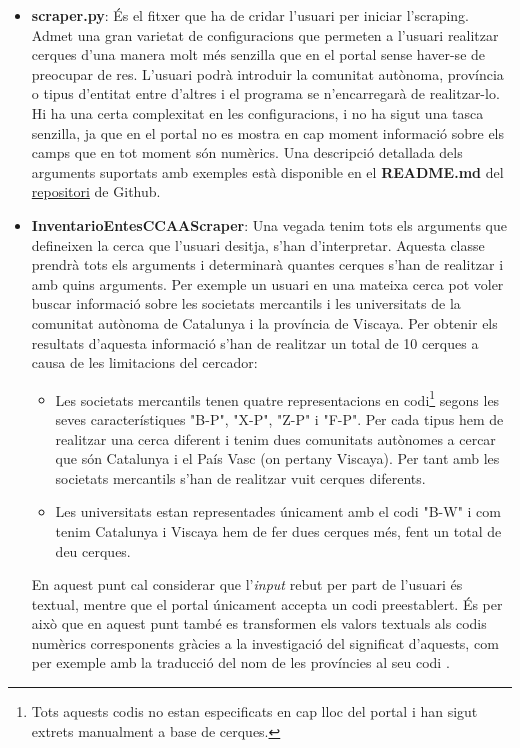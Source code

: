 \documentclass[12pt]{article}
\begin{document}
\begin{itemize}
    \item \textbf{scraper.py}: És el fitxer que ha de cridar l'usuari per iniciar l'scraping. Admet una gran varietat de configuracions que permeten a l'usuari realitzar cerques d'una manera molt més senzilla que en el portal sense haver-se de preocupar de res. L'usuari podrà introduir la comunitat autònoma, província o tipus d'entitat entre d'altres i el programa se n'encarregarà de realitzar-lo. Hi ha una certa complexitat en les configuracions, i no ha sigut una tasca senzilla, ja que en el portal no es mostra en cap moment informació sobre els camps que en tot moment són numèrics. Una descripció detallada dels arguments suportats amb exemples està disponible en el \textbf{README.md} del \href{https://github.com/boschmateo/InventarioEntesCCAA}{repositori} de Github.
    \item \textbf{InventarioEntesCCAAScraper}: Una vegada tenim tots els arguments que defineixen la cerca que l'usuari desitja, s'han d'interpretar. Aquesta classe prendrà tots els arguments i determinarà quantes cerques s'han de realitzar i amb quins arguments. Per exemple un usuari en una mateixa cerca pot voler buscar informació sobre les societats mercantils i les universitats de la comunitat autònoma de Catalunya i la província de Viscaya. Per obtenir els resultats d'aquesta informació s'han de realitzar un total de 10 cerques a causa de les limitacions del cercador:
    \begin{itemize}
        \item Les societats mercantils tenen quatre representacions en codi\footnote{Tots aquests codis no estan especificats en cap lloc del portal i han sigut extrets manualment a base de cerques.} segons les seves característiques "B-P", "X-P", "Z-P" i "F-P". Per cada tipus hem de realitzar una cerca diferent i tenim dues comunitats autònomes a cercar que són Catalunya i el País Vasc (on pertany Viscaya). Per tant amb les societats mercantils s'han de realitzar vuit cerques diferents.
        \item Les universitats estan representades únicament amb el codi "B-W" i com tenim Catalunya i Viscaya hem de fer dues cerques més, fent un total de deu cerques.
    \end{itemize}
    En aquest punt cal considerar que l'\textit{input} rebut per part de l'usuari és textual, mentre que el portal únicament accepta un codi preestablert. És per això que en aquest punt també es transformen els valors textuals als codis numèrics corresponents gràcies a la investigació del significat d'aquests, com per exemple amb la traducció del nom de les províncies al seu codi \cite{INE}.

\end{itemize}
\end{document}
